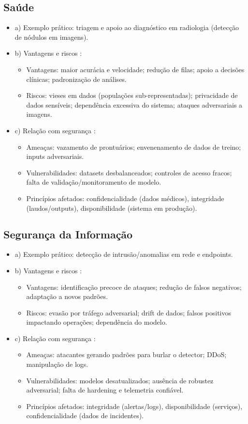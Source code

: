 \documentclass[a4paper,12pt]{article}
\begin{document}
\subsection{Saúde}
\begin{itemize}
\item a) Exemplo prático: triagem e apoio ao diagnóstico em radiologia (detecção de nódulos em imagens).
\item b) Vantagens e riscos \cite{oecd2019, who2021}:
  \begin{itemize}
  \item Vantagens: maior acurácia e velocidade; redução de filas; apoio a decisões clínicas; padronização de análises.
  \item Riscos: vieses em dados (populações sub-representadas); privacidade de dados sensíveis; dependência excessiva do sistema; ataques adversariais a imagens.
  \end{itemize}
\item c) Relação com segurança \cite{stallings1999}:
  \begin{itemize}
  \item Ameaças: vazamento de prontuários; envenenamento de dados de treino; inputs adversariais.
  \item Vulnerabilidades: datasets desbalanceados; controles de acesso fracos; falta de validação/monitoramento de modelo.
  \item Princípios afetados: confidencialidade (dados médicos), integridade (laudos/outputs), disponibilidade (sistema em produção).
  \end{itemize}
\end{itemize}

\subsection{Segurança da Informação}
\begin{itemize}
\item a) Exemplo prático: detecção de intrusão/anomalias em rede e endpoints.
\item b) Vantagens e riscos \cite{stamp2022}:
  \begin{itemize}
  \item Vantagens: identificação precoce de ataques; redução de falsos negativos; adaptação a novos padrões.
  \item Riscos: evasão por tráfego adversarial; drift de dados; falsos positivos impactando operações; dependência do modelo.
  \end{itemize}
\item c) Relação com segurança \cite{stallings1999}:
  \begin{itemize}
  \item Ameaças: atacantes gerando padrões para burlar o detector; DDoS; manipulação de logs.
  \item Vulnerabilidades: modelos desatualizados; ausência de robustez adversarial; falta de hardening e telemetria confiável.
  \item Princípios afetados: integridade (alertas/logs), disponibilidade (serviços), confidencialidade (dados de incidentes).
  \end{itemize}
\end{itemize}
\end{document}
